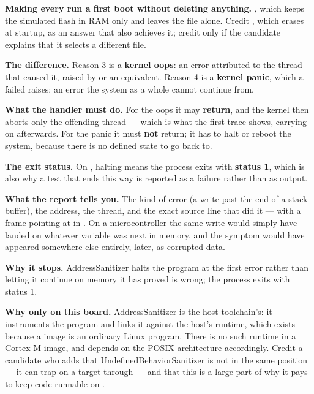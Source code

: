 \textbf{Making every run a first boot without deleting anything.} , which keeps
the simulated flash in RAM only and leaves the file alone. Credit , which erases
at startup, as an answer that also achieves it; credit  only if the candidate
explains that it selects a different file. 

\textbf{The difference.} Reason 3 is a \textbf{kernel oops}: an error attributed to the thread that
caused it, raised by  or an equivalent. Reason 4 is a \textbf{kernel panic}, which a
failed  raises: an error the system as a whole cannot continue from. 

\textbf{What the handler must do.} For the oops it may \textbf{return}, and the kernel then aborts
only the offending thread --- which is what the first trace shows,  carrying on
afterwards. For the panic it must \textbf{not} return; it has to halt or reboot the system, because
there is no defined state to go back to. 

\textbf{The exit status.} On , halting means the process exits with \textbf{status
1}, which is also why a test that ends this way is reported as a failure rather than as output.

\textbf{What the report tells you.} The kind of error (a write past the end of a stack buffer), the
address, the thread, and the exact source line that did it --- with a frame pointing at
 in . On a microcontroller the same write would simply have landed on
whatever variable was next in memory, and the symptom would have appeared somewhere else entirely,
later, as corrupted data. 

\textbf{Why it stops.} AddressSanitizer halts the program at the first error rather than letting it
continue on memory it has proved is wrong; the process exits with status 1. 

\textbf{Why only on this board.} AddressSanitizer is the host toolchain's: it instruments the
program and links it against the host's runtime, which exists because a  image is
an ordinary Linux program. There is no such runtime in a Cortex-M image, and 
depends on the POSIX architecture accordingly. Credit a candidate who adds that
UndefinedBehaviorSanitizer is not in the same position --- it can trap on a target through
 --- and that this is a large part of why it pays to keep code runnable on
. 

